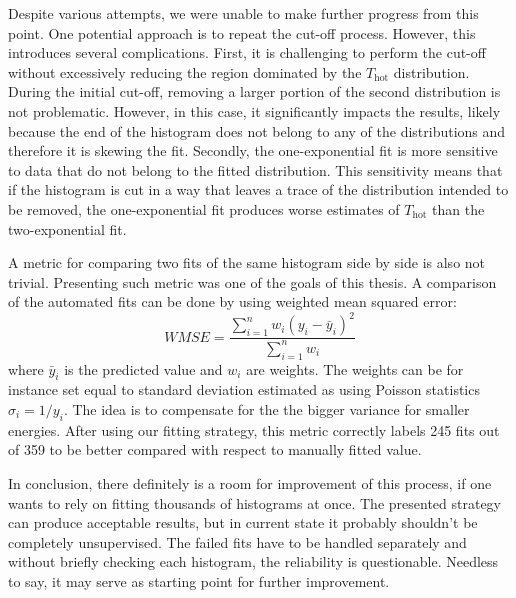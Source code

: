 Despite various attempts, we were unable to make further progress from this point. One potential approach is to repeat the cut-off process. However, this introduces several complications. First, it is challenging to perform the cut-off without excessively reducing the region dominated by the $T_\mathrm{hot}$ distribution. During the initial cut-off, removing a larger portion of the second distribution is not problematic. However, in this case, it significantly impacts the results, likely because the end of the histogram does not belong to any of the distributions and therefore it is skewing the fit. Secondly, the one-exponential fit is more sensitive to data that do not belong to the fitted distribution. This sensitivity means that if the histogram is cut in a way that leaves a trace of the distribution intended to be removed, the one-exponential fit produces worse estimates of $T_\mathrm{hot}$ than the two-exponential fit.

A metric for comparing two fits of the same histogram side by side is also not trivial. Presenting such metric was one of the goals of this thesis. A comparison of the automated fits can be done by using weighted mean squared error:
\begin{equation}
	WMSE = \frac{\sum_{i=1}^{n}w_i(y_i-\bar{y}_i)^2}{\sum_{i=1}^{n}w_i}
\end{equation}
where $\bar{y}_i$ is the predicted value and $w_i$ are weights. The weights can be for instance set equal to standard deviation estimated as using Poisson statistics $\sigma_i = 1/y_i$. The idea is to compensate for the the bigger variance for smaller energies. After using our fitting strategy, this metric correctly labels 245 fits out of 359 to be better compared with respect to manually fitted value.

In conclusion, there definitely is a room for improvement of this process, if one wants to rely on fitting thousands of histograms at once. The presented strategy can produce acceptable results, but in current state it probably shouldn't be completely unsupervised. The failed fits have to be handled separately and without briefly
checking each histogram, the reliability is questionable. Needless to say, it may serve as starting point for further improvement.

